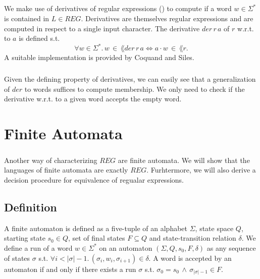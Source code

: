 \documentclass[11pt,a4paper,oneside]{book}
\begin{document}
                    \paragraph{}
                We make use of derivatives of regular expressions (\cite{DBLP:journals/jacm/Brzozowski64}) to compute if a word $w \in \Sigma^*$ is contained in $L \in REG$. Derivatives are themselves regular expressions and are computed in respect to a single input character. The derivative $der \,  r \, a$ of $r$ w.r.t. to $a$ is defined s.t. 
                \[
                    \forall w \in \Sigma^*. \, w \, \in \, \lang{der \, r \, a} \Leftrightarrow a\cdot w \, \in \, \lang{r}.
                \]
                A suitable implementation is provided by Coquand and Siles.


                \paragraph{} 
                    Given the defining property of derivatives, we can easily see that a generalization of $der$ to words suffices to compute membership. We only need to check if the derivative w.r.t. to a given word accepts the empty word.


            

    \chapter{Finite Automata}
        \paragraph{} 
        Another way of characterizing $REG$ are finite automata. 
        We will show that the languages of finite automata are exactly $REG$. 
        Furhtermore, we will also derive a decision procedure for equivalence of regualar expressions.

        \section{Definition}
            A finite automaton is defined as a five-tuple of an alphabet $\Sigma$, state space $Q$, starting state $s_0 \in Q$, set of final states $F \subseteq Q$ and state-transition relation $\delta$. 
            We define a run of a word $w \in \Sigma^*$ on an automaton $(\Sigma, Q, s_0, F, \delta)$ as any sequence of states $\sigma$ s.t. $\forall i < \vert\sigma\vert-1. \, (\sigma_i, w_i, \sigma_{i+1}) \in \delta$.
            A word is accepted by an automaton if and only if there exists a run $\sigma$ s.t. $\sigma_0 = s_0 \, \wedge \, \sigma_{\vert\sigma\vert-1} \in F$.
\end{document}
